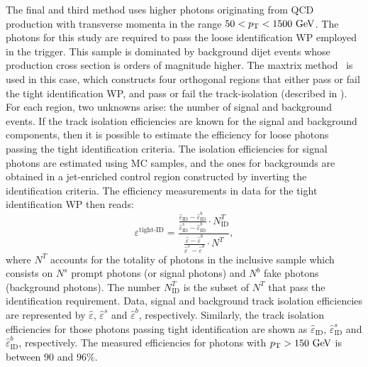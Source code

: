 The final and third method uses higher \pt photons originating from \ac{QCD} \gammajet production with transverse momenta in the range \(50<p_{\text{T}}<1500~\text{GeV}\). The photons for this study are required to pass the loose identification \ac{WP} employed in the trigger. This sample is dominated by background dijet events whose production cross section is orders of magnitude higher. The maxtrix method~\cite{ATLASEGammaPerformance20152016} is used in this case, which constructs four orthogonal regions that either pass or fail the tight identification \ac{WP}, and pass or fail the track-isolation (described in \Sect{\ref{subsec:objects:egamma:iso}}). For each region, two unknowns arise: the number of signal and background events.
If the track isolation efficiencies are known for the signal and background components, then it is possible to estimate the efficiency for loose photons passing the tight identification criteria. The isolation efficiencies for signal photons are estimated using \ac{MC} samples, and the ones for backgrounds are obtained in a jet-enriched control region constructed by inverting the identification criteria.
The efficiency measurements in data for the tight identification \ac{WP} then reads:
\begin{equation}
    \varepsilon^{\text{tight-ID}} = \frac{
        \frac{
            \hat{\varepsilon}_{\text{ID}} - \hat{\varepsilon}_{\text{ID}}^b
        }{
            \hat{\varepsilon}_{\text{ID}}^s - \hat{\varepsilon}_{\text{ID}}^b
        }
        \cdot
        N_{\text{ID}}^T
    }{
        \frac{
            \hat{\varepsilon} - \hat{\varepsilon}^b
        }{
            \hat{\varepsilon}^s - \hat{\varepsilon}^b
        }
        \cdot
        N^T
    },
\end{equation}
where \(N^T\) accounts for the totality of photons in the inclusive sample which consists on \(N^s\) prompt photons (or signal photons) and \(N^b\) fake photons (background photons). The number \(N^T_{\text{ID}}\) is the subset of \(N^T\) that pass the identification requirement. Data, signal and background track isolation efficiencies are represented by \(\hat{\varepsilon}\), \(\hat{\varepsilon}^s\) and \(\hat{\varepsilon}^b\), respectively. Similarly, the track isolation efficiencies for those photons passing tight identification are shown as \(\hat{\varepsilon}_{\text{ID}}\), \(\hat{\varepsilon}_{\text{ID}}^s\) and \(\hat{\varepsilon}_{\text{ID}}^b\), respectively. The measured efficiencies for photons with \(p_{\text{T}}>150~\text{GeV}\) is between \(90\) and \(96\%\).

